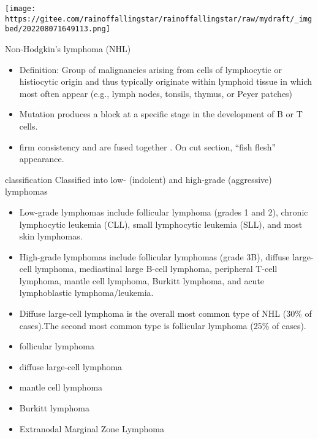 \documentclass[
  ignorenonframetext,
]{beamer}
\begin{document}
\begin{frame}
\texttt{[image: https://gitee.com/rainoffallingstar/rainoffallingstar/raw/mydraft/\_imgbed/202208071649113.png]}
\end{frame}

\begin{frame}
\begin{block}{Non-Hodgkin's lymphoma (NHL)}
\protect\hypertarget{non-hodgkins-lymphoma-nhl}{}
\begin{itemize}
\item
  Definition: Group of malignancies arising from cells of lymphocytic or
  histiocytic origin and thus typically originate within lymphoid tissue
  in which most often appear (e.g., lymph nodes, tonsils, thymus, or
  Peyer patches)
\item
  Mutation produces a block at a specific stage in the development of B
  or T cells.
\item
  firm consistency and are fused together . On cut section, ``fish
  flesh'' appearance.
\end{itemize}
\end{block}
\end{frame}

\begin{frame}
\begin{block}{classification}
\protect\hypertarget{classification}{}
Classified into low- (indolent) and high-grade (aggressive) lymphomas

\begin{itemize}
\item
  Low-grade lymphomas include follicular lymphoma (grades 1 and 2),
  chronic lymphocytic leukemia (CLL), small lymphocytic leukemia (SLL),
  and most skin lymphomas.
\item
  High-grade lymphomas include follicular lymphomas (grade 3B), diffuse
  large-cell lymphoma, mediastinal large B-cell lymphoma, peripheral
  T-cell lymphoma, mantle cell lymphoma, Burkitt lymphoma, and acute
  lymphoblastic lymphoma/leukemia.
\item
  Diffuse large-cell lymphoma is the overall most common type of NHL
  (30\% of cases).The second most common type is follicular lymphoma
  (25\% of cases).
\end{itemize}
\end{block}
\end{frame}

\begin{frame}
\begin{itemize}
\item
  follicular lymphoma
\item
  diffuse large-cell lymphoma
\item
  mantle cell lymphoma
\item
  Burkitt lymphoma
\item
  Extranodal Marginal Zone Lymphoma
\end{itemize}
\end{frame}
\end{document}

